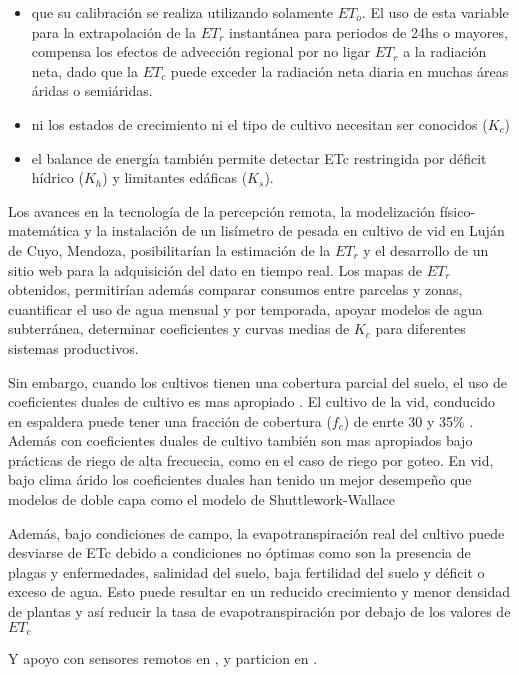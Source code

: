 \documentclass[]{article}
\begin{document}
\begin{itemize}
	\item que su calibración se realiza utilizando solamente $ET_o$. El uso de esta variable para la extrapolación de la $ET_r$ instantánea para periodos de 24hs o mayores, compensa los efectos de advección regional por no ligar $ET_r$ a la radiación neta, dado que la $ET_c$ puede exceder la radiación neta diaria en muchas áreas áridas o semiáridas.
	\item ni los estados de crecimiento ni el tipo de cultivo necesitan ser conocidos ($K_c$)
	\item el balance de energía también permite detectar ETc restringida por déficit hídrico ($K_h$) y limitantes edáficas ($K_s$).
\end{itemize}

Los avances en la tecnología  de la percepción remota,  la modelización físico-matemática y la instalación de un lisímetro de pesada en cultivo de vid en Luján de Cuyo, Mendoza, posibilitarían la estimación de la $ET_r$ y el desarrollo de un sitio web para la adquisición del dato en tiempo real. Los mapas de $ET_r$ obtenidos, permitirían además comparar consumos entre parcelas y zonas, cuantificar el uso de agua mensual y por temporada, apoyar modelos de agua subterránea, determinar coeficientes y curvas medias de $K_c$ para diferentes sistemas productivos.

Sin embargo, cuando los cultivos tienen una cobertura parcial del suelo, el uso de coeficientes duales de cultivo es mas apropiado \citep{Allen2006}. El cultivo de la vid, conducido en espaldera puede tener una fracción de cobertura ($f_c$) de enrte 30 y 35\% \citep{Allen2000, Poblete-Echeverria2012a}. Además con coeficientes duales de cultivo también son mas apropiados bajo prácticas de riego de alta frecuecia, como en el caso de riego por goteo. En vid, bajo clima árido los coeficientes duales han tenido un mejor desempeño que modelos de doble capa como el modelo de Shuttlework-Wallace \citep{Zhao2015a, Shuttleworth1985}

Además, bajo condiciones de campo, la evapotranspiración real del cultivo puede desviarse de ETc debido a condiciones no óptimas como son la presencia de plagas y enfermedades, salinidad del suelo, baja fertilidad del suelo y déficit o exceso de agua. Esto puede resultar en un reducido crecimiento y menor densidad de plantas y así reducir la tasa de evapotranspiración por  debajo de los valores de $ET_c$ \citep{Allen2006}

Y apoyo con sensores remotos en \citep{Er-Raki2007}, y particion en \citep{Er-Raki2010}.
\end{document}
